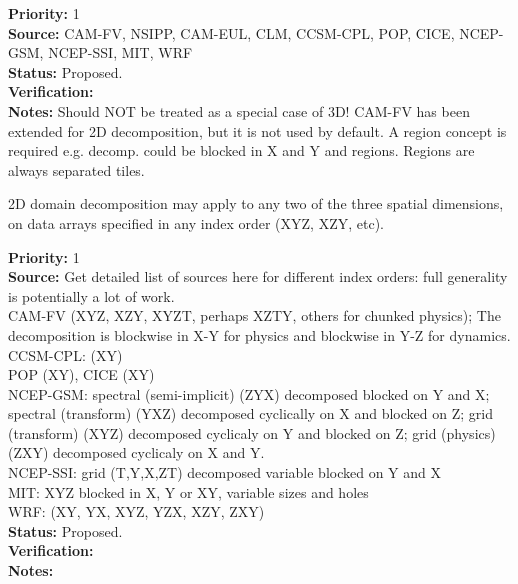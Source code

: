 \begin{reqlist}
{\bf Priority:} 1 \\ 
{\bf Source:} CAM-FV, NSIPP, CAM-EUL, CLM, CCSM-CPL, POP, CICE, NCEP-GSM, NCEP-SSI, MIT, WRF \\
{\bf Status:} Proposed. \\
{\bf Verification:} \\
{\bf Notes:} Should NOT be treated as a special case of 3D!
	CAM-FV has been extended for 2D decomposition, but 
	it is not used by default.
        A region concept is required e.g. decomp. could
        be blocked in X and Y and regions. Regions are always
        separated tiles.
\end{reqlist}


2D domain decomposition may apply to any two of the three spatial
dimensions, on data arrays specified in any index order (XYZ, XZY,
etc).

\begin{reqlist}
{\bf Priority:} 1 \\ 
{\bf Source:} Get detailed list of sources here for different index
  orders: full generality is potentially a lot of work. \\
  CAM-FV  (XYZ, XZY, XYZT, perhaps XZTY, others for chunked physics);
  The decomposition is blockwise in X-Y for physics and blockwise in 
  Y-Z for dynamics.  \\
  CCSM-CPL: (XY) \\
  POP (XY), CICE (XY) \\
  NCEP-GSM: spectral (semi-implicit) (ZYX) decomposed blocked on Y and X; 
            spectral (transform) (YXZ) decomposed cyclically on X and blocked on Z;
            grid (transform) (XYZ) decomposed cyclicaly on Y and blocked on Z; 
            grid (physics) (ZXY) decomposed cyclicaly on X and Y. \\
  NCEP-SSI: grid (T,Y,X,ZT) decomposed variable blocked on Y and X \\
  MIT: XYZ blocked in X, Y or XY, variable sizes and holes \\
  WRF: (XY, YX, XYZ, YZX, XZY, ZXY) \\
{\bf Status:} Proposed. \\
{\bf Verification:} \\
{\bf Notes:}
\end{reqlist}


